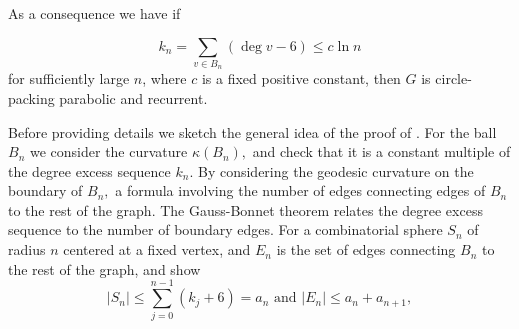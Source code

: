 As a consequence we have if

$$k_n=\sum_{v\in B_n}(\deg v -6)\leq c\ln n$$
for sufficiently large $n$, where $c$ is a fixed positive constant,
then $G$ is circle-packing parabolic and recurrent.

Before providing details we sketch the general idea of the proof of .
For the ball $B_n$ we consider the curvature $\kappa(B_n),$ 
and check that it is a constant multiple of the degree excess sequence $k_n.$
By considering the geodesic curvature on the boundary of $B_n,$ 
a formula involving the number of edges connecting edges of $B_n$
to the rest of the graph.
The Gauss-Bonnet theorem relates the degree excess sequence to
the number of boundary edges. For a combinatorial sphere
$S_n$ of radius $n$ centered at a fixed vertex, and $E_n$ is the set of edges
connecting $B_n$ to the rest of the graph, and show
$$|S_n|\leq \sum_{j=0}^{n-1}(k_j+6)=a_n \text{ and } |E_n|\leq a_n + a_{n+1},$$


